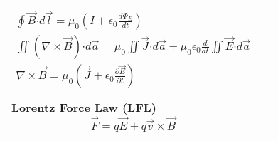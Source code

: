 \documentclass[12pt]{article}
\newcommand*{\dotP}{\boldsymbol \cdot}		%
\begin{document}
{\begin{tabular}{p{.49\linewidth} p{.49\linewidth}}
{		\begin{gather*}
			\boxed{ \oint \vec{B} \dotP d\vec{l} = \mu_0 \left( I + \epsilon_0 \frac{d\Phi_E}{dt} \right) }\\ 
			\iint (\nabla \times \vec{B}) \dotP d\vec{a} = \mu_0 \iint \vec{J} \dotP d\vec{a}
				+ \mu_0\epsilon_0\frac{d}{dt} \iint \vec{E} \dotP d\vec{a}\\
			\boxed{ \nabla \times \vec{B} = \mu_0 \left( \vec{J} 
				+ \epsilon_0 \frac{\partial \vec{E}}{\partial t} \right) } 
		\end{gather*} 
	} \\ \\[10pt]
	{
		\textbf{Lorentz Force Law (LFL)}
		\[ \boxed{ \vec{F} = q\vec{E} + q \vec{v} \times \vec{B} } \]
	} 
\end{tabular}
}

%
%
%
\newpage
\end{document}
